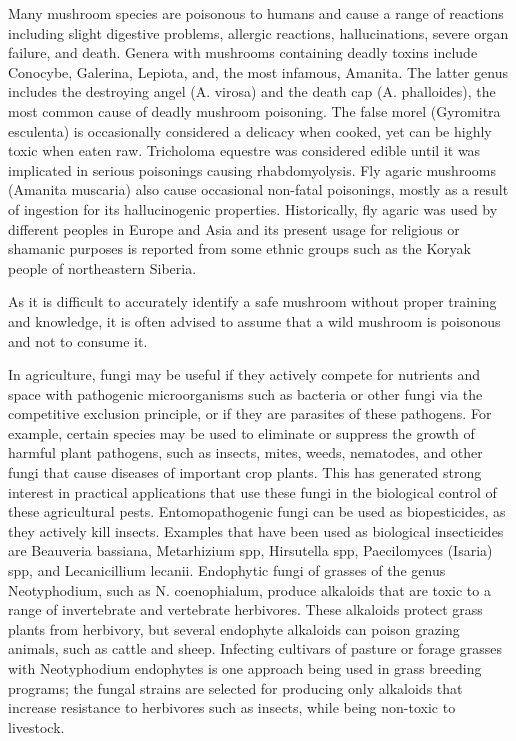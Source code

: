 Many mushroom species are poisonous to humans and cause a range of reactions including slight digestive problems, allergic reactions, hallucinations, severe organ failure, and death. Genera with mushrooms containing deadly toxins include Conocybe, Galerina, Lepiota, and, the most infamous, Amanita. The latter genus includes the destroying angel (A. virosa) and the death cap (A. phalloides), the most common cause of deadly mushroom poisoning. The false morel (Gyromitra esculenta) is occasionally considered a delicacy when cooked, yet can be highly toxic when eaten raw. Tricholoma equestre was considered edible until it was implicated in serious poisonings causing rhabdomyolysis. Fly agaric mushrooms (Amanita muscaria) also cause occasional non-fatal poisonings, mostly as a result of ingestion for its hallucinogenic properties. Historically, fly agaric was used by different peoples in Europe and Asia and its present usage for religious or shamanic purposes is reported from some ethnic groups such as the Koryak people of northeastern Siberia.

As it is difficult to accurately identify a safe mushroom without proper training and knowledge, it is often advised to assume that a wild mushroom is poisonous and not to consume it.

In agriculture, fungi may be useful if they actively compete for nutrients and space with pathogenic microorganisms such as bacteria or other fungi via the competitive exclusion principle, or if they are parasites of these pathogens. For example, certain species may be used to eliminate or suppress the growth of harmful plant pathogens, such as insects, mites, weeds, nematodes, and other fungi that cause diseases of important crop plants. This has generated strong interest in practical applications that use these fungi in the biological control of these agricultural pests. Entomopathogenic fungi can be used as biopesticides, as they actively kill insects. Examples that have been used as biological insecticides are Beauveria bassiana, Metarhizium spp, Hirsutella spp, Paecilomyces (Isaria) spp, and Lecanicillium lecanii. Endophytic fungi of grasses of the genus Neotyphodium, such as N. coenophialum, produce alkaloids that are toxic to a range of invertebrate and vertebrate herbivores. These alkaloids protect grass plants from herbivory, but several endophyte alkaloids can poison grazing animals, such as cattle and sheep. Infecting cultivars of pasture or forage grasses with Neotyphodium endophytes is one approach being used in grass breeding programs; the fungal strains are selected for producing only alkaloids that increase resistance to herbivores such as insects, while being non-toxic to livestock.

